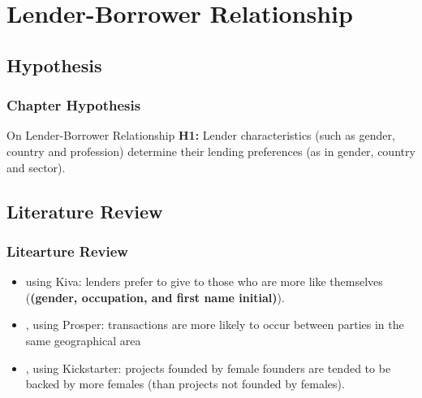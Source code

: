 \documentclass{beamer}
\begin{document}
\section{Lender-Borrower Relationship}

\subsection{Hypothesis}
\begin{frame}\frametitle{Chapter Hypothesis}
\begin{block}{On Lender-Borrower Relationship}
\textbf{H1:} Lender characteristics (such as gender, country and profession) determine their lending preferences (as in gender, country and sector).
\end{block}
\end{frame}

\subsection{Literature Review}
\begin{frame}\frametitle{Litearture Review}
\begin{itemize}
\item \textcite{Galak2010} using Kiva: lenders prefer to give to those who are more like themselves (\textbf{(gender, occupation, and first name initial)}).
\item \textcite{Lin2013}, using Prosper: transactions are more likely to occur between parties in the same geographical area
\item \textcite{Greenberg2015}, using Kickstarter: projects founded by female founders are tended to be backed by more females (than projects not founded by females).
\end{itemize}
\end{frame}
\end{document}
